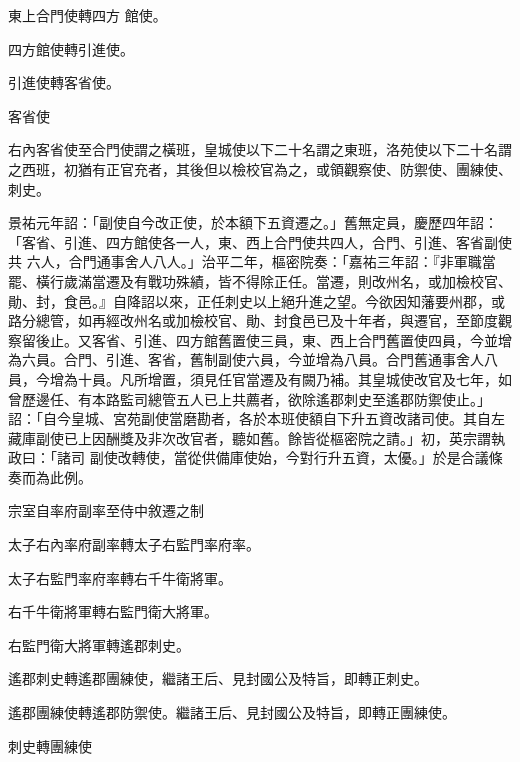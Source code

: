 \begin{pinyinscope}
 東上合門使轉四方
 館使。



 四方館使轉引進使。



 引進使轉客省使。



 客省使



 右內客省使至合門使謂之橫班，皇城使以下二十名謂之東班，洛苑使以下二十名謂之西班，初猶有正官充者，其後但以檢校官為之，或領觀察使、防禦使、團練使、刺史。



 景祐元年詔：「副使自今改正使，於本額下五資遷之。」舊無定員，慶歷四年詔：「客省、引進、四方館使各一人，東、西上合門使共四人，合門、引進、客省副使共
 六人，合門通事舍人八人。」治平二年，樞密院奏：「嘉祐三年詔：『非軍職當罷、橫行歲滿當遷及有戰功殊績，皆不得除正任。當遷，則改州名，或加檢校官、勛、封，食邑。』自降詔以來，正任刺史以上絕升進之望。今欲因知藩要州郡，或路分總管，如再經改州名或加檢校官、勛、封食邑已及十年者，與遷官，至節度觀察留後止。又客省、引進、四方館舊置使三員，東、西上合門舊置使四員，今並增為六員。合門、引進、客省，舊制副使六員，今並增為八員。合門舊通事舍人八員，今增為十員。凡所增置，須見任官當遷及有闕乃補。其皇城使改官及七年，如曾歷邊任、有本路監司總管五人已上共薦者，欲除遙郡刺史至遙郡防禦使止。」詔：「自今皇城、宮苑副使當磨勘者，各於本班使額自下升五資改諸司使。其自左藏庫副使已上因酬獎及非次改官者，聽如舊。餘皆從樞密院之請。」初，英宗謂執政曰：「諸司
 副使改轉使，當從供備庫使始，今對行升五資，太優。」於是合議條奏而為此例。



 宗室自率府副率至侍中敘遷之制



 太子右內率府副率轉太子右監門率府率。



 太子右監門率府率轉右千牛衛將軍。



 右千牛衛將軍轉右監門衛大將軍。



 右監門衛大將軍轉遙郡刺史。



 遙郡刺史轉遙郡團練使，繼諸王后、見封國公及特旨，即轉正刺史。



 遙郡團練使轉遙郡防禦使。繼諸王后、見封國公及特旨，即轉正團練使。



 刺史轉團練使




\end{pinyinscope}
